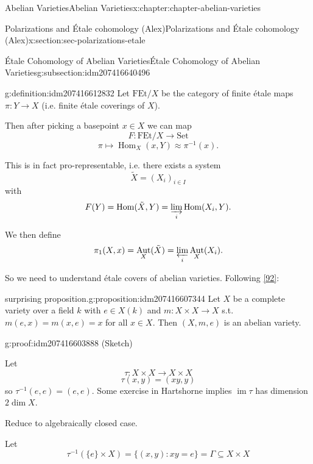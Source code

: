 \documentclass[oneside,10pt,]{book}
\numberwithin{equation}{section}
\DeclareMathOperator{\Hom}{Hom}
\DeclareMathOperator{\im}{im}
\DeclareMathOperator{\Aut}{Aut}
\begin{document}
\begin{chapterptx}{Abelian Varieties}{}{Abelian Varieties}{}{}{x:chapter:chapter-abelian-varieties}
\begin{sectionptx}{Polarizations and Étale cohomology (Alex)}{}{Polarizations and Étale cohomology (Alex)}{}{}{x:section:sec-polarizations-etale}
\begin{subsectionptx}{Étale Cohomology of Abelian Varieties}{}{Étale Cohomology of Abelian Varieties}{}{}{g:subsection:idm207416640496}
\begin{definition}{}{g:definition:idm207416612832}%
Let \(\mathrm{FEt}/X\) be the category of finite étale maps \(\pi\colon Y \to X\) (i.e. finite étale coverings of \(X\)).%
\par
Then after picking a basepoint \(x\in X\) we can map%
\begin{equation*}
F\colon \mathrm{FEt}/X\to \mathrm{Set}
\end{equation*}
%
\begin{equation*}
\pi\mapsto \Hom_X(x,Y) \approx\pi^{-1}(x)\text{.}
\end{equation*}
%
\par
This is in fact pro-representable, i.e. there exists a system%
\begin{equation*}
\tilde X = (X_i)_{i\in I}
\end{equation*}
with%
\begin{equation*}
F(Y) = \Hom(\tilde X ,Y) = \varinjlim_i \Hom(X_i, Y)\text{.}
\end{equation*}
%
\par
We then define%
\begin{equation*}
\pi_1(X,x) = \Aut_X(\tilde X) = \varprojlim_i \Aut_X(X_i)\text{.}
\end{equation*}
%
\end{definition}
So we need to understand étale covers of abelian varieties. Following \hyperlink{x:biblio:bib-vandergeer-moonen}{[92]}:%
\begin{proposition}{surprising proposition.}{}{g:proposition:idm207416607344}%
Let \(X\)  be a complete variety over a field \(k\) with \(e\in X(k)\) and \(m \colon X\times X\to X\) s.t. \(m(e,x) = m(x,e) = x\) for all \(x \in X\). Then \((X, m,e)\) is an abelian variety.%
\end{proposition}
\begin{proofptx}{}{g:proof:idm207416603888}
(Sketch)%
\par
Let%
\begin{equation*}
\tau\colon X\times X \to X\times X
\end{equation*}
%
\begin{equation*}
\tau(x,y) = (xy,y)
\end{equation*}
so \(\tau^{-1} (e,e) = (e,e)\). Some exercise in Hartshorne implies \(\im \tau\) has dimension \(2\dim X\).%
\par
Reduce to algebraically closed case.%
\par
Let%
\begin{equation*}
\tau^{-1}(\{e\} \times X) =  \{(x,y) : xy = e\} = \Gamma \subseteq X\times X

\end{equation*}
\end{proofptx}
\end{subsectionptx}
\end{sectionptx}
\end{chapterptx}
\end{document}
